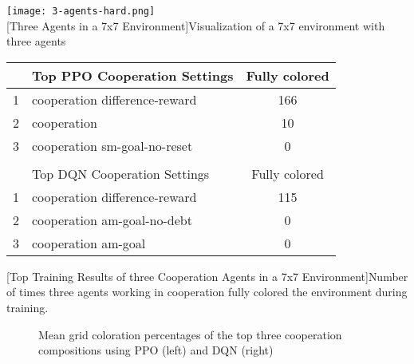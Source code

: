 \begin{minipage}{\textwidth}
  \begin{minipage}[b]{0.29\textwidth}
    \centering
    \texttt{[image: 3-agents-hard.png]}\\
    [Three Agents in a 7x7 Environment]{Visualization of a 7x7 environment with three agents}\label{fig:3-hard}
  \end{minipage}
  \hfill
    \begin{minipage}[b]{0.69\textwidth}
    \centering
    \begin{tabular}{clc}\hline
         & Top PPO Cooperation Settings & Fully colored \\ \hline
        {\small1} & cooperation difference-reward & 166 \\
        {\small2} & cooperation & 10 \\
        {\small3} & cooperation sm-goal-no-reset & 0 \\ \hline
         &   \\ \hline
         & Top DQN Cooperation Settings & Fully colored \\ \hline
        {\small 1} & cooperation difference-reward & 115 \\
        {\small 2} & cooperation am-goal-no-debt & 0 \\
        {\small 3} & cooperation am-goal & 0 \\ \hline
        \end{tabular}
        [Top Training Results of three Cooperation Agents in a 7x7 Environment]{Number of times three agents working in cooperation fully colored the environment during training. \\}\label{t:3-coop-hard}
    \end{minipage}
  \end{minipage}

\begin{figure}[hpbt]
    \centering
    \hspace{0.01\textwidth}
    \caption[Mean Coloration Percentage of the Top Cooperation Modes in a 7x7 Environment]{Mean grid coloration percentages of the top three cooperation compositions using PPO (left) and DQN (right)}
    \label{fig:multipic_plots_coop_hard}
\end{figure}

